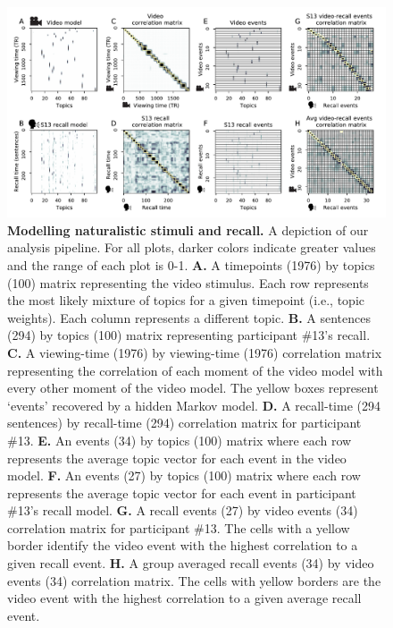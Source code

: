 \documentclass{article}
\begin{document}
\begin{figure}[tp]
\centering
\includegraphics[width=\textwidth]{figs/2_eventseg.pdf}
\caption{\small \textbf{Modelling naturalistic stimuli and recall.} A depiction of our analysis pipeline. For all plots, darker colors indicate greater values and the range of each plot is 0-1.  \textbf{A.} A timepoints (1976) by topics (100) matrix representing the video stimulus.  Each row represents the most likely mixture of topics for a given timepoint (i.e., topic weights). Each column represents a different topic. \textbf{B.} A sentences (294) by topics (100) matrix representing participant \#13's recall. \textbf{C.} A viewing-time (1976) by viewing-time (1976) correlation matrix representing the correlation of each moment of the video model with every other moment of the video model. The yellow boxes represent `events' recovered by a hidden Markov model. \textbf{D.} A recall-time (294 sentences) by recall-time (294) correlation matrix for participant \#13. \textbf{E.} An events (34) by topics (100) matrix where each row represents the average topic vector for each event in the video model.  \textbf{F.} An events (27) by topics (100) matrix where each row represents the average topic vector for each event in participant \#13's recall model. \textbf{G.} A recall events (27) by video events (34) correlation matrix for participant \#13. The cells with a yellow border identify the video event with the highest correlation to a given recall event. \textbf{H.} A group averaged recall events (34) by video events (34) correlation matrix.  The cells with yellow borders are the video event with the highest correlation to a given average recall event.}
\label{fig:model}
\end{figure}
\end{document}
